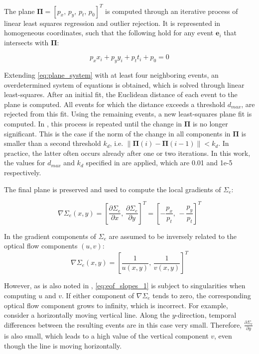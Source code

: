 The plane $\mathbf{\Pi} = \left[p_x,\, p_y,\, p_t,\, p_0\right]^T$ is computed through an iterative process of linear least squares regression and outlier rejection. It is represented in homogeneous coordinates, such that the following hold for any event $\mathbf{e}_i$ that intersects with $\mathbf{\Pi}$:

\begin{equation}
\label{eq:plane_system}
p_x x_i + p_y y_i + p_t t_i + p_0 = 0
\end{equation}

Extending \cref{eq:plane_system} with at least four neighboring events, an overdetermined system of equations is obtained, which is solved through linear least-squares. After an initial fit, the Euclidean distance of each event to the plane is computed. All events for which the distance exceeds a threshold $d_{max}$, are rejected from this fit. Using the remaining events, a new least-squares plane fit is computed. In \citet{Benosman2014}, this process is repeated until the change in $\mathbf{\Pi}$ is no longer significant. This is the case if the norm of the change in all components in $\mathbf{\Pi}$ is smaller than a second threshold $k_d$, i.e. $\left\| {\mathbf{\Pi} (i) - \mathbf{\Pi} (i - 1)} \right\| < k_d$. In practice, the latter often occurs already after one or two iterations. In this work, the values for $d_{max}$ and $k_d$ specified in \citet{Ruckauer2016} are applied, which are 0.01 and 1e-5 respectively.

The final plane is preserved and used to compute the local gradients of $\Sigma_e$:

\begin{equation}
\nabla {\Sigma _e}\left( {x,y} \right) = {\left[ {\frac{{\partial {\Sigma _e}}}{{\partial x}},\,\frac{{\partial {\Sigma _e}}}{{\partial y}}} \right]^T} = \left[-\frac{p_x}{p_t},\, -\frac{p_y}{p_t} \right]^T
\end{equation}

In \citet{Benosman2014} the gradient components of $\Sigma_e$ are assumed to be inversely related to the optical flow components $(u,v)$:
\begin{equation}
\label{eq:eof_slopes_1}
\nabla {\Sigma _e}\left( {x,y} \right)  = {\left[ {\frac{1}{{u\left( {x,y} \right)}},\,\frac{1}{{v\left( {x,y} \right)}}} \right]^T}
\end{equation}

However, as is also noted in \citet{Brosch2015,Ruckauer2016}, \cref{eq:eof_slopes_1} is subject to singularities when computing $u$ and $v$. If either component of $\nabla\Sigma_e$ tends to zero, the corresponding optical flow component grows to infinity, which is incorrect. For example, consider a horizontally moving vertical line. Along the $y$-direction, temporal differences between the resulting events are in this case very small. Therefore, $\frac{{\partial {\Sigma _e}}}{{\partial y}}$ is also small, which leads to a high value of the vertical component $v$, even though the line is moving horizontally.

